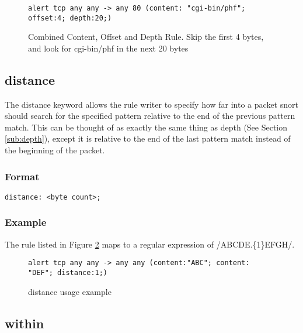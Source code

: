 \documentclass[english]{report}
\begin{document}
\begin{figure}[!hbpt]
\begin{verbatim}
alert tcp any any -> any 80 (content: "cgi-bin/phf"; offset:4; depth:20;)
\end{verbatim}

\caption{\label{combined rule with offset and depth} Combined Content, Offset
and Depth Rule. Skip the first 4 bytes, and look for cgi-bin/phf in the next 20 bytes}
\end{figure}

\subsection{distance\label{sub:Distance}}

The distance keyword allows the rule writer to specify how far into a packet snort
should search for the specified pattern relative to the end of the previous pattern match.  This can be thought of as exactly the same thing as depth (See Section \ref{sub:depth}), except it is relative to the end of the last pattern match instead of the beginning of the packet.

\subsubsection{Format}

\begin{verbatim}
distance: <byte count>;
\end{verbatim}

\subsubsection{Example}

The rule listed in Figure \ref{fig:Distance} maps to a regular
expression of /ABCDE.\{1\}EFGH/.

\begin{figure}[!hbpt]
\begin{verbatim}
alert tcp any any -> any any (content:"ABC"; content: "DEF"; distance:1;)
\end{verbatim}
\caption{distance usage example \label{fig:Distance}}
\end{figure}



\subsection{within\label{sub:Within}}
\end{document}
